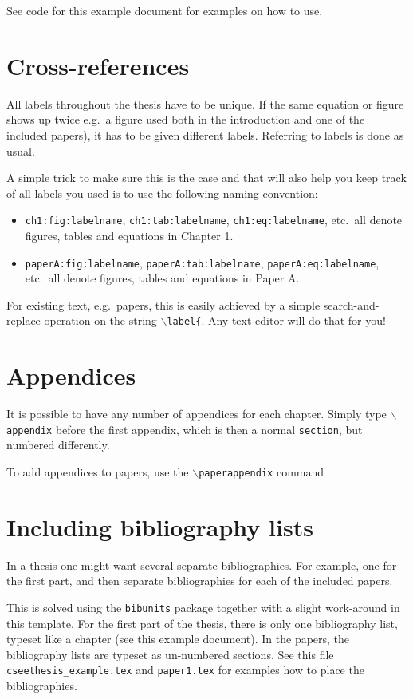 See code for this example document for examples on how to use.

\section{Cross-references}
All labels throughout the thesis have to be unique. If the same
equation or figure shows up twice e.g.\ a figure used
both in the introduction and one of the included papers), it has
to be given different labels. Referring to labels is done as
usual.

A simple trick to make sure this is the case and that will also help you keep track of all labels you used is to use the following naming convention:
\begin{itemize}
	\item \texttt{ch1:fig:labelname}, \texttt{ch1:tab:labelname}, \texttt{ch1:eq:labelname}, etc.\ all denote figures, tables and equations in Chapter 1.
	\item \texttt{paperA:fig:labelname}, \texttt{paperA:tab:labelname}, \texttt{paperA:eq:labelname}, etc.\ all denote figures, tables and equations in Paper A.
\end{itemize}

For existing text, e.g.\ papers, this is easily achieved by a simple search-and-replace operation on the string \texttt{$\backslash$label\{}. Any text editor will do that for you!

\section{Appendices\label{sec:app}}
It is possible to have any number of appendices for each chapter.
Simply type \texttt{$\backslash$appendix} before the first appendix,
which is then a normal \texttt{section}, but numbered differently.

To add appendices to papers, use the
\texttt{$\backslash$paperappendix} command

\section{Including bibliography lists\label{sec:bib}}
In a thesis one might want several separate bibliographies. For
example, one for the first part, and then separate bibliographies
for each of the included papers.

This is solved using the \texttt{bibunits} package together with a
slight work-around in this template. For the first part of the
thesis, there is only one bibliography list, typeset like a chapter
(see this example document). In the papers, the bibliography lists
are typeset as un-numbered sections. See this file
\texttt{cseethesis\_example.tex} and \texttt{paper1.tex} for examples
how to place the bibliographies. 

